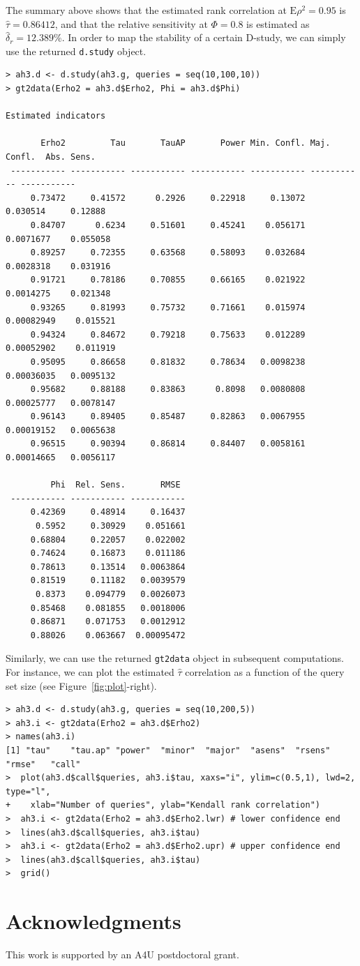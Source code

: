 \documentclass[twoside]{article}
\begin{document}
The summary above shows that the estimated rank correlation at $\text{E}\rho^2=0.95$ is $\hat\tau=0.86412$, and that the relative sensitivity at $\Phi=0.8$ is estimated as $\hat\delta_r=12.389\%$.
In order to map the stability of a certain D-study, we can simply use the returned \texttt{d.study} object.
{\small\begin{verbatim}
> ah3.d <- d.study(ah3.g, queries = seq(10,100,10))
> gt2data(Erho2 = ah3.d$Erho2, Phi = ah3.d$Phi)

Estimated indicators

       Erho2         Tau       TauAP       Power Min. Confl. Maj. Confl.  Abs. Sens.
 ----------- ----------- ----------- ----------- ----------- ----------- -----------
     0.73472     0.41572      0.2926     0.22918     0.13072    0.030514     0.12888 
     0.84707      0.6234     0.51601     0.45241    0.056171   0.0071677    0.055058 
     0.89257     0.72355     0.63568     0.58093    0.032684   0.0028318    0.031916 
     0.91721     0.78186     0.70855     0.66165    0.021922   0.0014275    0.021348 
     0.93265     0.81993     0.75732     0.71661    0.015974  0.00082949    0.015521 
     0.94324     0.84672     0.79218     0.75633    0.012289  0.00052902    0.011919 
     0.95095     0.86658     0.81832     0.78634   0.0098238  0.00036035   0.0095132 
     0.95682     0.88188     0.83863      0.8098   0.0080808  0.00025777   0.0078147 
     0.96143     0.89405     0.85487     0.82863   0.0067955  0.00019152   0.0065638 
     0.96515     0.90394     0.86814     0.84407   0.0058161  0.00014665   0.0056117 

         Phi  Rel. Sens.       RMSE
 ----------- ----------- -----------
     0.42369     0.48914     0.16437 
      0.5952     0.30929    0.051661 
     0.68804     0.22057    0.022002 
     0.74624     0.16873    0.011186 
     0.78613     0.13514   0.0063864 
     0.81519     0.11182   0.0039579 
      0.8373    0.094779   0.0026073 
     0.85468    0.081855   0.0018006 
     0.86871    0.071753   0.0012912 
     0.88026    0.063667  0.00095472 
\end{verbatim}}

Similarly, we can use the returned \texttt{gt2data} object in subsequent computations. For instance, we can plot the estimated $\hat\tau$ correlation as a function of the query set size (see Figure~\ref{fig:plot}-right).

{\small\begin{verbatim}
> ah3.d <- d.study(ah3.g, queries = seq(10,200,5))
> ah3.i <- gt2data(Erho2 = ah3.d$Erho2)
> names(ah3.i)
[1] "tau"    "tau.ap" "power"  "minor"  "major"  "asens"  "rsens"  "rmse"   "call"  
>  plot(ah3.d$call$queries, ah3.i$tau, xaxs="i", ylim=c(0.5,1), lwd=2, type="l",
+    xlab="Number of queries", ylab="Kendall rank correlation")
>  ah3.i <- gt2data(Erho2 = ah3.d$Erho2.lwr) # lower confidence end
>  lines(ah3.d$call$queries, ah3.i$tau)
>  ah3.i <- gt2data(Erho2 = ah3.d$Erho2.upr) # upper confidence end
>  lines(ah3.d$call$queries, ah3.i$tau)
>  grid()
\end{verbatim}}

\section*{Acknowledgments}
This work is supported by an A4U postdoctoral grant.



\end{document}
